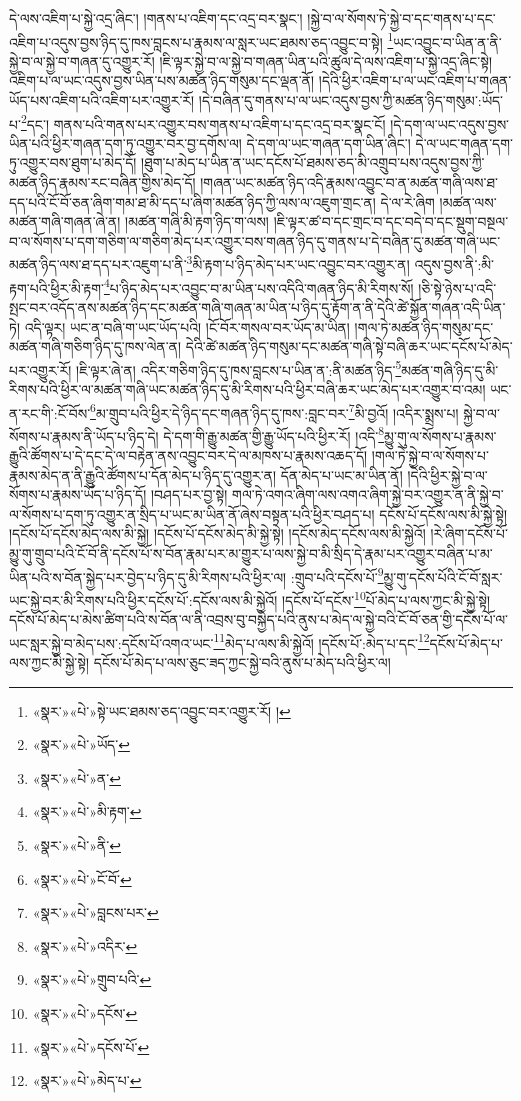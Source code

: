 དེ་ལས་འཇིག་པ་སྐྱེ་འདྲ་ཞིང་། །གནས་པ་འཇིག་དང་འདྲ་བར་སྣང་། །སྐྱེ་བ་ལ་སོགས་ཏེ་སྐྱེ་བ་དང་གནས་པ་དང་འཇིག་པ་འདུས་བྱས་ཉིད་དུ་ཁས་བླངས་པ་རྣམས་ལ་སླར་ཡང་ཐམས་ཅད་འབྱུང་བ་སྟེ། \footnote{«སྣར་»«པེ་»སྟེ་ཡང་ཐམས་ཅད་འབྱུང་བར་འགྱུར་རོ། ། }ཡང་འབྱུང་བ་ཡིན་ན་ནི་སྐྱེ་བ་ལ་སྐྱེ་བ་གཞན་དུ་འགྱུར་རོ། །ཇི་ལྟར་སྐྱེ་བ་ལ་སྐྱེ་བ་གཞན་ཡིན་པའི་ཚུལ་དེ་ལས་འཇིག་པ་སྐྱེ་འདྲ་ཞིང་སྟེ། འཇིག་པ་ལ་ཡང་འདུས་བྱས་ཡིན་པས་མཚན་ཉིད་གསུམ་དང་ལྡན་ནོ། །དེའི་ཕྱིར་འཇིག་པ་ལ་ཡང་འཇིག་པ་གཞན་ཡོད་པས་འཇིག་པའི་འཇིག་པར་འགྱུར་རོ། །དེ་བཞིན་དུ་གནས་པ་ལ་ཡང་འདུས་བྱས་ཀྱི་མཚན་ཉིད་གསུམ་:ཡོད་པ་\footnote{«སྣར་»«པེ་»ཡོད་}དང་། གནས་པའི་གནས་པར་འགྱུར་བས་གནས་པ་འཇིག་པ་དང་འདྲ་བར་སྣང་ངོ། །དེ་དག་ལ་ཡང་འདུས་བྱས་ཡིན་པའི་ཕྱིར་གཞན་དག་ཏུ་འགྱུར་བར་བྱ་དགོས་ལ། དེ་དག་ལ་ཡང་གཞན་དག་ཡིན་ཞིང་། དེ་ལ་ཡང་གཞན་དག་ཏུ་འགྱུར་བས་ཐུག་པ་མེད་དོ། །ཐུག་པ་མེད་པ་ཡིན་ན་ཡང་དངོས་པོ་ཐམས་ཅད་མི་འགྲུབ་པས་འདུས་བྱས་ཀྱི་མཚན་ཉིད་རྣམས་རང་བཞིན་གྱིས་མེད་དོ། །གཞན་ཡང་མཚན་ཉིད་འདི་རྣམས་འབྱུང་བ་ན་མཚན་གཞི་ལས་ཐ་དད་པའི་ངོ་བོ་ཅན་ཞིག་གམ་ཐ་མི་དད་པ་ཞིག་མཚན་ཉིད་ཀྱི་ལས་ལ་འཇུག་གྲང་ན། དེ་ལ་རེ་ཞིག །མཚན་ལས་མཚན་གཞི་གཞན་ཞེ་ན། །མཚན་གཞི་མི་རྟག་ཉིད་ག་ལས། །ཇི་ལྟར་ཚ་བ་དང་གྲང་བ་དང་བདེ་བ་དང་སྡུག་བསྔལ་བ་ལ་སོགས་པ་དག་གཅིག་ལ་གཅིག་མེད་པར་འགྱུར་བས་གཞན་ཉིད་དུ་གནས་པ་དེ་བཞིན་དུ་མཚན་གཞི་ཡང་མཚན་ཉིད་ལས་ཐ་དད་པར་འཇུག་པ་ནི་\footnote{«སྣར་»«པེ་»ན་}མི་རྟག་པ་ཉིད་མེད་པར་ཡང་འབྱུང་བར་འགྱུར་ན། འདུས་བྱས་ནི་:མི་རྟག་པའི་ཕྱིར་མི་རྟག་\footnote{«སྣར་»«པེ་»མི་རྟག་}པ་ཉིད་མེད་པར་འབྱུང་བ་མ་ཡིན་པས་འདིའི་གཞན་ཉིད་མི་རིགས་སོ། །ཅི་སྟེ་ཉེས་པ་འདི་སྤང་བར་འདོད་ནས་མཚན་ཉིད་དང་མཚན་གཞི་གཞན་མ་ཡིན་པ་ཉིད་དུ་རྟོག་ན་ནི་དེའི་ཚེ་སྐྱོན་གཞན་འདི་ཡིན་ཏེ། འདི་ལྟར། ཡང་ན་བཞི་ག་ཡང་ཡོད་པའི། །ངོ་བོར་གསལ་བར་ཡོད་མ་ཡིན། །གལ་ཏེ་མཚན་ཉིད་གསུམ་དང་མཚན་གཞི་གཅིག་ཉིད་དུ་ཁས་ལེན་ན། དེའི་ཚེ་མཚན་ཉིད་གསུམ་དང་མཚན་གཞི་སྟེ་བཞི་ཆར་ཡང་དངོས་པོ་མེད་པར་འགྱུར་རོ། །ཇི་ལྟར་ཞེ་ན། འདིར་གཅིག་ཉིད་དུ་ཁས་བླངས་པ་ཡིན་ན་:ནི་མཚན་ཉིད་\footnote{«སྣར་»«པེ་»ནི་}མཚན་གཞི་ཉིད་དུ་མི་རིགས་པའི་ཕྱིར་ལ་མཚན་གཞི་ཡང་མཚན་ཉིད་དུ་མི་རིགས་པའི་ཕྱིར་བཞི་ཆར་ཡང་མེད་པར་འགྱུར་བ་འམ། ཡང་ན་རང་གི་:ངོ་བོས་\footnote{«སྣར་»«པེ་»ངོ་བོ་}མ་གྲུབ་པའི་ཕྱིར་དེ་ཉིད་དང་གཞན་ཉིད་དུ་ཁས་:བླང་བར་\footnote{«སྣར་»«པེ་»བླངས་པར་}མི་བྱའོ། །འདིར་སྨྲས་པ། སྐྱེ་བ་ལ་སོགས་པ་རྣམས་ནི་ཡོད་པ་ཉིད་དེ། དེ་དག་གི་རྒྱུ་མཚན་གྱི་རྒྱུ་ཡོད་པའི་ཕྱིར་རོ། །འདི་\footnote{«སྣར་»«པེ་»འདིར་}མྱུ་གུ་ལ་སོགས་པ་རྣམས་རྒྱུའི་ཚོགས་པ་དེ་དང་དེ་ལ་བརྟེན་ནས་འབྱུང་བར་དེ་ལ་མཁས་པ་རྣམས་འཆད་དོ། །གལ་ཏེ་སྐྱེ་བ་ལ་སོགས་པ་རྣམས་མེད་ན་ནི་རྒྱུའི་ཚོགས་པ་དོན་མེད་པ་ཉིད་དུ་འགྱུར་ན། དོན་མེད་པ་ཡང་མ་ཡིན་ནོ། །དེའི་ཕྱིར་སྐྱེ་བ་ལ་སོགས་པ་རྣམས་ཡོད་པ་ཉིད་དོ། །བཤད་པར་བྱ་སྟེ། གལ་ཏེ་འགའ་ཞིག་ལས་འགའ་ཞིག་སྐྱེ་བར་འགྱུར་ན་ནི་སྐྱེ་བ་ལ་སོགས་པ་དག་ཏུ་འགྱུར་ན་སྲིད་པ་ཡང་མ་ཡིན་ནོ་ཞེས་བསྟན་པའི་ཕྱིར་བཤད་པ། དངོས་པོ་དངོས་ལས་མི་སྐྱེ་སྟེ། །དངོས་པོ་དངོས་མེད་ལས་མི་སྐྱེ། །དངོས་པོ་དངོས་མེད་མི་སྐྱེ་སྟེ། །དངོས་མེད་དངོས་ལས་མི་སྐྱེའོ། །རེ་ཞིག་དངོས་པོ་མྱུ་གུ་གྲུབ་པའི་ངོ་བོ་ནི་དངོས་པོ་ས་བོན་རྣམ་པར་མ་གྱུར་པ་ལས་སྐྱེ་བ་མི་སྲིད་དེ་རྣམ་པར་འགྱུར་བཞིན་པ་མ་ཡིན་པའི་ས་བོན་སྐྱེད་པར་བྱེད་པ་ཉིད་དུ་མི་རིགས་པའི་ཕྱིར་ལ། :གྲུབ་པའི་དངོས་པོ་\footnote{«སྣར་»«པེ་»གྲུབ་པའི་}མྱུ་གུ་དངོས་པོའི་ངོ་བོ་སླར་ཡང་སྐྱེ་བར་མི་རིགས་པའི་ཕྱིར་དངོས་པོ་:དངོས་ལས་མི་སྐྱེའོ། །དངོས་པོ་དངོས་\footnote{«སྣར་»«པེ་»དངོས་}པོ་མེད་པ་ལས་ཀྱང་མི་སྐྱེ་སྟེ། དངོས་པོ་མེད་པ་མེས་ཚིག་པའི་ས་བོན་ལ་ནི་འབྲས་བུ་བསྐྱེད་པའི་ནུས་པ་མེད་ལ་སྐྱེ་བའི་ངོ་བོ་ཅན་གྱི་དངོས་པོ་ལ་ཡང་སླར་སྐྱེ་བ་མེད་པས་:དངོས་པོ་འགའ་ཡང་\footnote{«སྣར་»«པེ་»དངོས་པོ་}མེད་པ་ལས་མི་སྐྱེའོ། །དངོས་པོ་:མེད་པ་དང་\footnote{«སྣར་»«པེ་»མེད་པ་}དངོས་པོ་མེད་པ་ལས་ཀྱང་མི་སྐྱེ་སྟེ། དངོས་པོ་མེད་པ་ལས་ཅུང་ཟད་ཀྱང་སྐྱེ་བའི་ནུས་པ་མེད་པའི་ཕྱིར་ལ། 